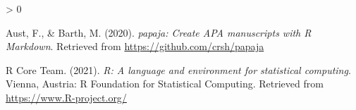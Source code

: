 \documentclass[
  english,
  man]{apa6}
\newlength{\cslhangindent}
\newenvironment{CSLReferences}[2] %
 {%
  \setlength{\parindent}{0pt}
  \ifodd #1 \everypar{\setlength{\hangindent}{\cslhangindent}}\ignorespaces\fi
  \ifnum #2 > 0
  \setlength{\parskip}{#2\baselineskip}
  \fi
 }%
 {}
\begin{document}
\begingroup
\setlength{\parindent}{-0.5in}
\setlength{\leftskip}{0.5in}

\hypertarget{refs}{}
\begin{CSLReferences}{1}{0}
\leavevmode{}%
Aust, F., \& Barth, M. (2020). \emph{{papaja}: {Create} {APA} manuscripts with {R Markdown}}. Retrieved from \url{https://github.com/crsh/papaja}

\leavevmode{}%
R Core Team. (2021). \emph{R: A language and environment for statistical computing}. Vienna, Austria: R Foundation for Statistical Computing. Retrieved from \url{https://www.R-project.org/}

\end{CSLReferences}

\endgroup
\end{document}
